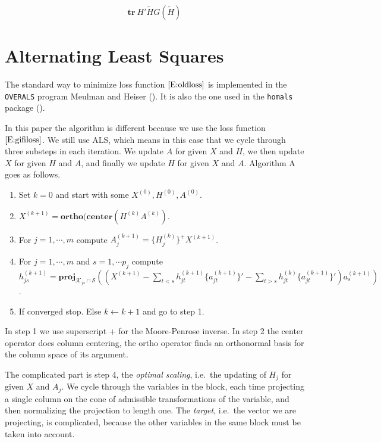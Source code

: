 \documentclass[
  12pt,
  letterpaper,
]{scrbook}
\providecommand{\tightlist}{%
  \setlength{\itemsep}{0pt}\setlength{\parskip}{0pt}}
\begin{document}
\[
\mathbf{tr}\ H'\tilde HG(\tilde H)
\]

\section{Alternating Least Squares}\label{alternating-least-squares}

The standard way to minimize loss function \(\eqref{E:oldloss}\) is
implemented in the \texttt{OVERALS} program Meulman and Heiser
(). It is also the one used in the
\texttt{homals} package ().

In this paper the algorithm is different because we use the loss
function \(\eqref{E:gifiloss}\). We still use ALS, which means in this
case that we cycle through three substeps in each iteration. We update
\(A\) for given \(X\) and \(H\), we then update \(X\) for given \(H\)
and \(A\), and finally we update \(H\) for given \(X\) and \(A\).
Algorithm A goes as follows.

\begin{enumerate}
\def\labelenumi{\arabic{enumi}.}
\setcounter{enumi}{-1}
\tightlist
\item
  Set \(k=0\) and start with some \(X^{(0)},H^{(0)},A^{(0)}\).
\item
  \(X^{(k+1)}=\mathbf{ortho}(\mathbf{center}(H^{(k)}A^{(k)})\).
\item
  For \(j=1,\cdots,m\) compute \(A_j^{(k+1)}=\{H_j^{(k)}\}^+X^{(k+1)}\).
\item
  For \(j=1,\cdots,m\) and \(s=1,\cdots p_j\) compute
  \(h_{js}^{(k+1)}=\mathbf{proj}_{\mathcal{K}_{js}\cap\mathcal{S}}((X^{(k+1)}-\sum_{t<s}h_{jt}^{(k+1)}\{a_{jt}^{(k+1)}\}'-\sum_{t>s}h_{jt}^{(k)}\{a_{jt}^{(k+1)}\}')a_s^{(k+1)})\).
\item
  If converged stop. Else \(k\leftarrow k+1\) and go to step 1.
\end{enumerate}

In step 1 we use superscript + for the Moore-Penrose inverse. In step 2
the center operator does column centering, the ortho operator finds an
orthonormal basis for the column space of its argument.

The complicated part is step 4, the \emph{optimal scaling}, i.e.~the
updating of \(H_j\) for given \(X\) and \(A_j\). We cycle through the
variables in the block, each time projecting a single column on the cone
of admissible transformations of the variable, and then normalizing the
projection to length one. The \emph{target}, i.e.~the vector we are
projecting, is complicated, because the other variables in the same
block must be taken into account.
\end{document}
